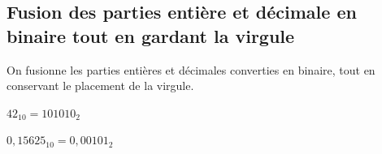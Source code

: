 \documentclass[11pt,a4paper]{article}
\begin{document}



\bigskip

\subsection{Fusion des parties entière et décimale en binaire tout en gardant la virgule}

\medskip

On fusionne les parties entières et décimales converties en binaire, tout en conservant le placement de la virgule.

\medskip

$ 42_{10} = 101010_{2} $

\medskip

$ 0,15625_{10} = 0,00101_{2} $

\bigskip
\end{document}

